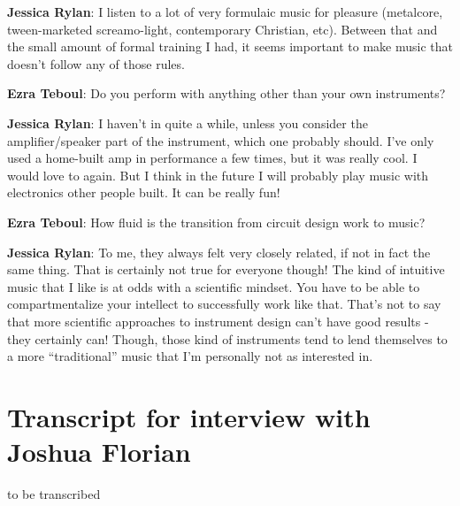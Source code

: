 \textbf{Jessica Rylan}: I listen to a lot of very formulaic music for pleasure (metalcore, tween-marketed screamo-light, contemporary Christian, etc). Between that and the small amount of formal training I had, it seems important to make music that doesn't follow any of those rules.

\textbf{Ezra Teboul}: Do you perform with anything other than your own instruments? 
                  
\textbf{Jessica Rylan}: I haven't in quite a while, unless you consider the amplifier/speaker part of the instrument, which one probably should. I've only used a home-built amp in performance a few times, but it was really cool. I would love to again. But I think in the future I will probably play music with electronics other people built. It can be really fun!

\textbf{Ezra Teboul}: How fluid is the transition from circuit design work to music?  

\textbf{Jessica Rylan}: To me, they always felt very closely related, if not in fact the same thing. That is certainly not true for everyone though! The kind of intuitive music that I like is at odds with a scientific mindset. You have to be able to compartmentalize your intellect to successfully work like that. That's not to say that more scientific approaches to instrument design can't have good results - they certainly can! Though, those kind of instruments tend to lend themselves to a more ``traditional'' music that I'm personally not as interested in.

\newpage
\clearpage 

\section{Transcript for interview with Joshua Florian}

to be transcribed